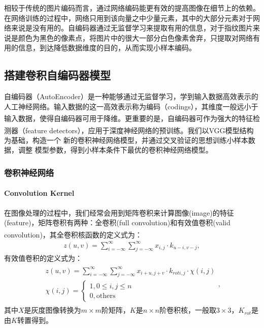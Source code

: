 \documentclass{whutmod}
\newcommand{\upcite}[1]{\textsuperscript{\cite{#1}}}
\begin{document}
			相较于传统的图片编码而言，通过网络编码能更有效的提高图像在细节上的依赖。在网络训练的过程中，网络只用到该向量之中少量元素，其中的大部分元素对于网络来说是没有用的。自编码器通过无监督学习来提取有用的信息，对于指纹图片来说是颜色为黑色的像素点，将图片中的很大一部分白色像素舍弃，只提取对网络有用的信息，到达降低数据维度的目的，从而实现小样本编码。
		
%			
		\subsection{搭建卷积自编码器模型}
		   自编码器（AutoEncoder）是一种能够通过无监督学习，学到输入数据高效表示的人工神经网络。输入数据的这一高效表示称为编码（codings），其维度一般远小于输入数据，使得自编码器可用于降维\upcite{10}。更重要的是，自编码器可作为强大的特征检测器（feature detectors），应用于深度神经网络的预训练。我们以VGG模型\upcite{4}结构为基础，构造一个 新的卷积神经网络模型，并通过交叉验证的思想训练小样本数据，调整
		   模型参数，得到小样本条件下最优的卷积神经网络模型。
		
			\subsubsection{卷积神经网络}
			
			\paragraph{Convolution Kernel} 在图像处理的过程中，我们经常会用到矩阵卷积来计算图像(image)的特征(feature)，矩阵卷积有两种：全卷积(full convolution)和有效值卷积(valid convolution)\upcite{11}，其全卷积核函数的定义式为：
			     \begin{gather}
z(u, v)=\sum_{i=-\infty}^{\infty} \sum_{j=-\infty}^{\infty} x_{i, j} \cdot k_{u-i, v-j},
			     \end{gather}
			有效值卷积的定义式为：
			\begin{gather}
\begin{array}{c}
z(u, v)=\displaystyle\sum_{i=-\infty}^{\infty} \sum_{j=-\infty}^{\infty} x_{i+u, j+v} \cdot k_{r o t i, j} \cdot \chi(i, j) \\
\chi(i, j)=\left\{  
\begin{array}{c}
1,0 \leqslant i, j \leqslant n \\
0, \text {others}
\end{array}
\right.  
\end{array},
			\end{gather}
			其中$X$是灰度图像转换为$m\times m$阶矩阵，$K$是$n\times n$阶卷积核，一般取$3\times 3$，$K_{rot}$是由$K$转置得到。
			
\end{document}
